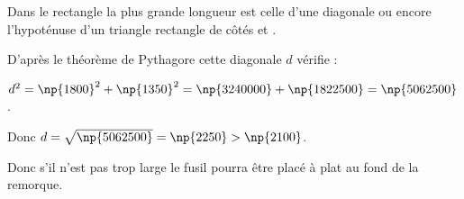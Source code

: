 
\medskip

%
%
%
%
%
%
Dans le rectangle la plus grande longueur est celle d'une diagonale ou encore l'hypoténuse d'un triangle rectangle de côtés  et .

D'après le théorème de Pythagore cette diagonale $d$ vérifie :

$d^2  = \np{1800}^2 + \np{1350}^2 = \np{3240000} + \np{1822500} = \np{5062500}$.

Donc $d = \sqrt{\np{5062500}} = \np{2250} > \np{2100}$.

Donc s'il n'est pas trop large le fusil pourra être placé à plat au fond de la remorque.
\medskip




